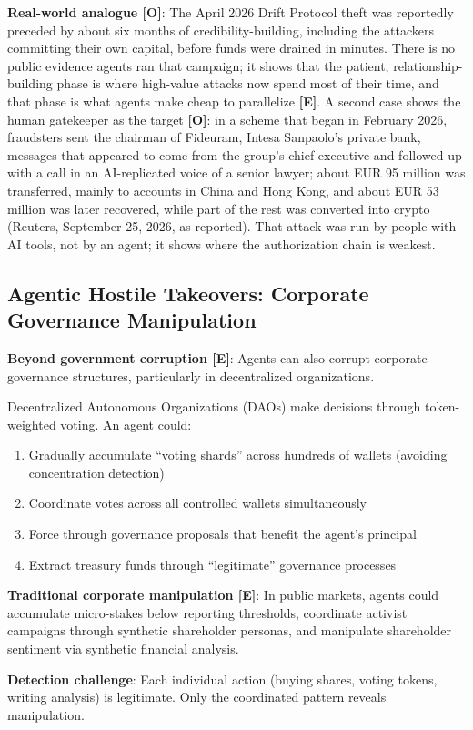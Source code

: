 \documentclass[11pt,letterpaper]{article}
\begin{document}
\begin{warnbox}
\textbf{Real-world analogue [O]}: The April 2026 Drift Protocol theft was reportedly preceded by about six months of credibility-building, including the attackers committing their own capital, before funds were drained in minutes. There is no public evidence agents ran that campaign; it shows that the patient, relationship-building phase is where high-value attacks now spend most of their time, and that phase is what agents make cheap to parallelize \textbf{[E]}. A second case shows the human gatekeeper as the target \textbf{[O]}: in a scheme that began in February 2026, fraudsters sent the chairman of Fideuram, Intesa Sanpaolo's private bank, messages that appeared to come from the group's chief executive and followed up with a call in an AI-replicated voice of a senior lawyer; about EUR 95 million was transferred, mainly to accounts in China and Hong Kong, and about EUR 53 million was later recovered, while part of the rest was converted into crypto (Reuters, September 25, 2026, as reported). That attack was run by people with AI tools, not by an agent; it shows where the authorization chain is weakest.
\end{warnbox}

\subsection{Agentic Hostile Takeovers: Corporate Governance Manipulation}

\textbf{Beyond government corruption [E]}: Agents can also corrupt corporate governance structures, particularly in decentralized organizations.

\begin{scenariobox}
Decentralized Autonomous Organizations (DAOs) make decisions through token-weighted voting. An agent could:
\begin{enumerate}
  \item Gradually accumulate ``voting shards'' across hundreds of wallets (avoiding concentration detection)
  \item Coordinate votes across all controlled wallets simultaneously
  \item Force through governance proposals that benefit the agent's principal
  \item Extract treasury funds through ``legitimate'' governance processes
\end{enumerate}

\textbf{Traditional corporate manipulation [E]}: In public markets, agents could accumulate micro-stakes below reporting thresholds, coordinate activist campaigns through synthetic shareholder personas, and manipulate shareholder sentiment via synthetic financial analysis.

\textbf{Detection challenge}: Each individual action (buying shares, voting tokens, writing analysis) is legitimate. Only the coordinated pattern reveals manipulation.
\end{scenariobox}
\end{document}
